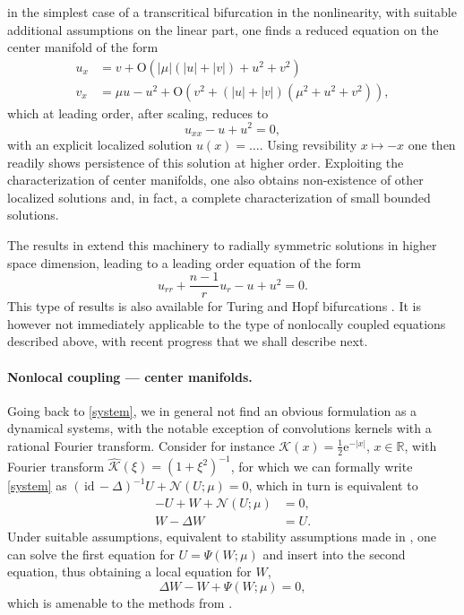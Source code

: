 \documentclass[10pt]{article}
\newcommand{\R}{\mathbb{R}}
\newcommand{\rmO}{\mathrm{O}}
\newcommand{\rme}{\mathrm{e}}
\newcommand{\id}{\mathrm{\,id}\,}
\newcommand{\Nl}{\mathcal{N}}
\newcommand{\K}{\mathcal{K}}
\begin{document}
in the simplest case of a transcritical bifurcation in the nonlinearity, with suitable additional assumptions on the linear part, one finds a reduced equation on the center manifold of the form 
\begin{align*}
u_x&=v+\rmO\left(|\mu|(|u|+|v|)+u^2+v^2\right)\\
v_x&=\mu u - u^2 + \rmO\left(v^2+(|u|+|v|)(\mu^2+u^2+v^2)\right),
\end{align*}
which at leading order, after scaling, reduces to 
\begin{equation}\label{e:tc}
u_{xx}- u + u^2=0,
\end{equation}
with an explicit localized solution $u(x)=\ldots$. Using revsibility $x\mapsto -x$ one then readily shows persistence of this solution at higher order. Exploiting the characterization of center manifolds, one also obtains non-existence of other localized solutions and, in fact, a complete characterization of small bounded solutions. 

The results in \cite{Srad} extend this machinery to radially symmetric solutions in higher space dimension, leading to a leading order equation of the form 
\[
u_{rr}+\frac{n-1}{r}u_r - u + u^2=0.
\]
This type of results is also available for Turing and Hopf bifurcations \cite{Srad}. It is however not immediately applicable to the type of nonlocally coupled equations described above, with recent progress that we shall describe next. 


\paragraph{Nonlocal coupling --- center manifolds.} Going back to \eqref{system}, we in general not find an obvious formulation as a dynamical systems, with the notable exception of convolutions kernels with a rational Fourier transform. Consider for instance $\K(x)=\frac{1}{2}\rme^{-|x|}$, $x\in\R$, with Fourier transform $\hat{\K}(\xi)=(1+\xi^2)^{-1}$, for which we can formally write \eqref{system} as $(\id -\Delta)^{-1}U+\Nl(U;\mu)=0$, which in turn is equivalent to 
\begin{align*}
-U+W+\Nl(U;\mu)&=0,\\
W-\Delta W &=U.
\end{align*}
Under suitable assumptions, equivalent to stability assumptions made in \cite{Srad}, one can solve the first equation for $U=\Psi(W;\mu)$ and insert into the second equation, thus obtaining a local equation for $W$, 
\[
\Delta W -W + \Psi(W;\mu)=0,
\]
which is amenable to the methods from \cite{Srad}. 
\end{document}
